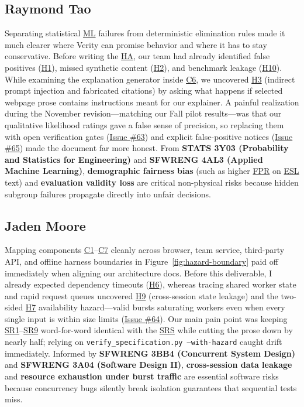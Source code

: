 \documentclass[11pt]{article}
\newcommand{\ESL}{\hyperlink{ha-acr-esl}{ESL}}
\newcommand{\FPR}{\hyperlink{ha-acr-fpr}{FPR}}
\newcommand{\HA}{\hyperlink{ha-acr-ha}{HA}}
\newcommand{\ML}{\hyperlink{ha-acr-ml}{ML}}
\newcommand{\SRS}{\hyperlink{ha-acr-srs}{SRS}}
\begin{document}
\subsection*{Raymond Tao}
Separating statistical \ML{} failures from deterministic elimination rules made it much clearer where Verity can promise behavior and where it has to stay conservative. Before writing the \HA{}, our team had already identified false positives (\hyperref[haz:H1]{H1}), missed synthetic content (\hyperref[haz:H2]{H2}), and benchmark leakage (\hyperref[haz:H10]{H10}). While examining the explanation generator inside \hyperref[comp:C6]{C6}, we uncovered \hyperref[haz:H3]{H3} (indirect prompt injection and fabricated citations) by asking what happens if selected webpage prose contains instructions meant for our explainer. A painful realization during the November revision---matching our Fall pilot results---was that our qualitative likelihood ratings gave a false sense of precision, so replacing them with open verification gates (\href{https://github.com/richy1337/Verity/issues/63}{Issue \#63}) and explicit false-positive notices (\href{https://github.com/richy1337/Verity/issues/65}{Issue \#65}) made the document far more honest. From \textbf{STATS 3Y03 (Probability and Statistics for Engineering)} and \textbf{SFWRENG 4AL3 (Applied Machine Learning)}, \textbf{demographic fairness bias} (such as higher \FPR{} on \ESL{} text) and \textbf{evaluation validity loss} are critical non-physical risks because hidden subgroup failures propagate directly into unfair decisions.

\subsection*{Jaden Moore}
Mapping components \hyperref[comp:C1]{C1}--\hyperref[comp:C7]{C7} cleanly across browser, team service, third-party API, and offline harness boundaries in Figure~\ref{fig:hazard-boundary} paid off immediately when aligning our architecture docs. Before this deliverable, I already expected dependency timeouts (\hyperref[haz:H6]{H6}), whereas tracing shared worker state and rapid request queues uncovered \hyperref[haz:H9]{H9} (cross-session state leakage) and the two-sided \hyperref[haz:H7]{H7} availability hazard—valid bursts saturating workers even when every single input is within size limits (\href{https://github.com/richy1337/Verity/issues/64}{Issue \#64}). Our main pain point was keeping \hyperref[SR1]{SR1}--\hyperref[SR9]{SR9} word-for-word identical with the \SRS{} while cutting the prose down by nearly half; relying on \texttt{verify\_specification.py --with-hazard} caught drift immediately. Informed by \textbf{SFWRENG 3BB4 (Concurrent System Design)} and \textbf{SFWRENG 3A04 (Software Design II)}, \textbf{cross-session data leakage} and \textbf{resource exhaustion under burst traffic} are essential software risks because concurrency bugs silently break isolation guarantees that sequential tests miss.
\end{document}
